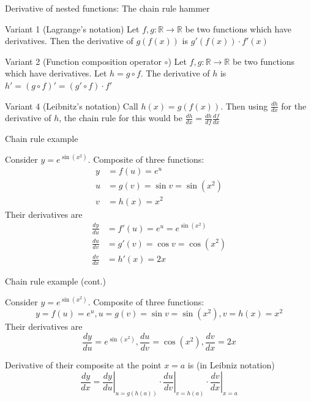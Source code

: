 \documentclass[12pt,aspectratio=169]{beamer}
\begin{document}
\begin{frame}{Derivative of nested functions: The chain rule hammer}


\begin{block}{Variant 1 (Lagrange's notation)}
Let $f, g : \mathbb{R} \to \mathbb{R}$ be two functions which have derivatives. Then the derivative of $g (f(x))$ is $g' (f(x)) \cdot f' (x)$
\end{block}
\pause

\begin{block}{Variant 2 (Function composition operator $\circ$)}
Let $f, g : \mathbb{R} \to \mathbb{R}$ be two functions which have derivatives. Let $h = g \circ f$. The derivative of $h$ is $h'=(g \circ f)'=(g'\circ f)\cdot f'$
\end{block}
\pause

\begin{block}{Variant 4 (Leibnitz's notation)}
Call $h(x) = g(f(x))$. Then using $\frac{dh}{dx}$ for the derivative of $h$, the chain rule for this would be $\frac{dh}{dx} = \frac{dh}{df} \frac{df}{dx}$
\end{block}

\end{frame}


\begin{frame}{Chain rule example}

Consider $y=e^{\sin(x^{2})}$. Composite of three functions:
$$
\begin{aligned}
y &= f(u) = e^u \\
u &= g(v) = \sin v = \sin (x^2) \\
v &= h(x) = x^2
\end{aligned}
$$
\pause
Their derivatives are
$$
\begin{aligned}
\frac{dy}{du} &= f'(u) = e^u = e^{\sin(x^{2})} \\
\frac{du}{dv} &= g'(v) = \cos v = \cos (x^2) \\
\frac{dv}{dx} &= h'(x) = 2x
\end{aligned}
$$
\end{frame}


\begin{frame}{Chain rule example (cont.)}
	
Consider $y=e^{\sin(x^{2})}$. Composite of three functions:
$$y = f(u) = e^u, u = g(v) = \sin v = \sin (x^2), v = h(x) = x^2$$
Their derivatives are
$$\frac{dy}{du} = e^{\sin(x^{2})}, \frac{du}{dv} = \cos (x^2), \frac{dv}{dx} = 2x$$

\pause

Derivative of their composite at the point $x = a$ is (in Leibniz notation)
$$
{\frac {dy}{dx}}=\left.{\frac {dy}{du}}\right|_{u=g(h(a))}\cdot \left.{\frac {du}{dv}}\right|_{v=h(a)}\cdot \left.{\frac {dv}{dx}}\right|_{x=a}
$$
	
\end{frame}
\end{document}
